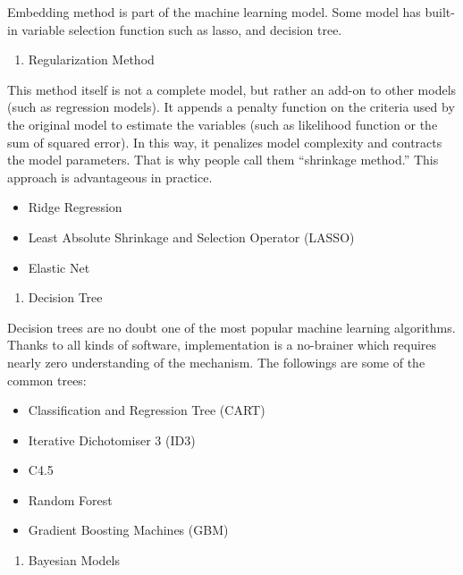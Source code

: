 \documentclass[12pt,]{krantz}
\providecommand{\tightlist}{%
  \setlength{\itemsep}{0pt}\setlength{\parskip}{0pt}}
\theoremstyle{definition}
\theoremstyle{definition}
\theoremstyle{remark}
\begin{document}
Embedding method is part of the machine learning model. Some model has
built-in variable selection function such as lasso, and decision tree.

\begin{enumerate}
\def\labelenumi{\arabic{enumi}.}
\setcounter{enumi}{3}
\tightlist
\item
  Regularization Method
\end{enumerate}

This method itself is not a complete model, but rather an add-on to
other models (such as regression models). It appends a penalty function
on the criteria used by the original model to estimate the variables
(such as likelihood function or the sum of squared error). In this way,
it penalizes model complexity and contracts the model parameters. That
is why people call them ``shrinkage method.'' This approach is
advantageous in practice.

\begin{itemize}
\tightlist
\item
  Ridge Regression
\item
  Least Absolute Shrinkage and Selection Operator (LASSO)
\item
  Elastic Net
\end{itemize}

\begin{enumerate}
\def\labelenumi{\arabic{enumi}.}
\setcounter{enumi}{4}
\tightlist
\item
  Decision Tree
\end{enumerate}

Decision trees are no doubt one of the most popular machine learning
algorithms. Thanks to all kinds of software, implementation is a
no-brainer which requires nearly zero understanding of the mechanism.
The followings are some of the common trees:

\begin{itemize}
\tightlist
\item
  Classification and Regression Tree (CART)
\item
  Iterative Dichotomiser 3 (ID3)
\item
  C4.5
\item
  Random Forest
\item
  Gradient Boosting Machines (GBM)
\end{itemize}

\begin{enumerate}
\def\labelenumi{\arabic{enumi}.}
\setcounter{enumi}{5}
\tightlist
\item
  Bayesian Models
\end{enumerate}
\end{document}
